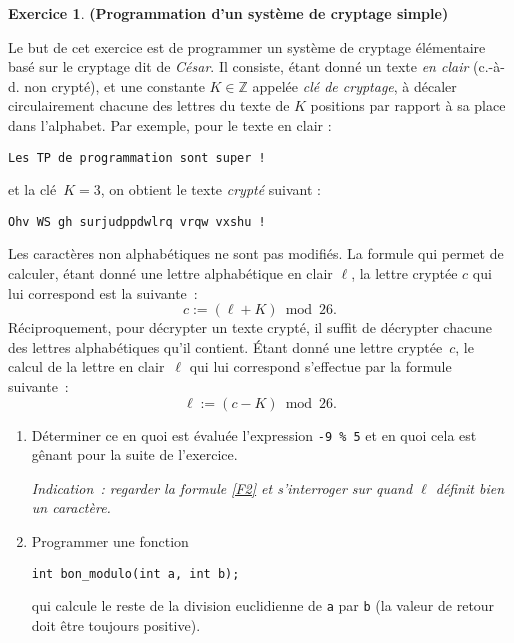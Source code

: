 \documentclass[12pt]{article}
\theoremstyle{definition}
\newtheorem{Exercice}{Exercice}
\begin{document}
\begin{Exercice} {\bf (Programmation d'un système de cryptage simple)}
\smallskip

Le but de cet exercice est de programmer un système de cryptage élémentaire
basé sur le cryptage dit de \textit{César}. Il consiste, étant donné un
texte \textit{en clair} (c.-à-d. non crypté), et une constante
$K \in \mathbb{Z}$ appelée \textit{clé de cryptage}, à décaler
circulairement chacune des lettres du texte de $K$ positions par rapport
à sa place dans l'alphabet. Par exemple, pour le texte en clair :
\begin{center}
    {\tt Les TP de programmation sont super !}
\end{center}
et la clé~$K = 3$, on obtient le texte \textit{crypté} suivant :
\begin{center}
    {\tt Ohv WS gh surjudppdwlrq vrqw vxshu !}
\end{center}
Les caractères non alphabétiques ne sont pas modifiés.
La formule qui permet de calculer, étant donné une lettre alphabétique 
en clair $\ell$, la lettre cryptée $c$ qui lui correspond est la 
suivante~:
\begin{equation} \label{F1}
    c := (\ell + K) ~\operatorname{mod}~ 26.
\end{equation}
Réciproquement, pour décrypter un texte crypté, il suffit de décrypter 
chacune des lettres alphabétiques qu'il contient. Étant donné une lettre 
cryptée~$c$, le calcul de la lettre en clair~$\ell$ qui lui
correspond s'effectue par la formule suivante~:
\begin{equation} \label{F2}
    \ell := (c - K) ~\operatorname{mod}~ 26.
\end{equation}
\begin{enumerate}
    \item Déterminer ce en quoi est évaluée l'expression {\tt -9 \% 5}
    et en quoi cela est gênant pour la suite de l'exercice.
    \smallskip

    {\it Indication~: regarder la formule \eqref{F2} et s'interroger sur
    quand $\ell$ définit bien un caractère.}
    \smallskip

    \item Programmer une fonction
\begin{lstlisting}
int bon_modulo(int a, int b);
\end{lstlisting}
    qui calcule le reste de la division euclidienne de {\tt a} par 
    {\tt b} (la valeur de retour doit être toujours positive).
    \smallskip


\end{enumerate}
\end{Exercice}
\end{document}
